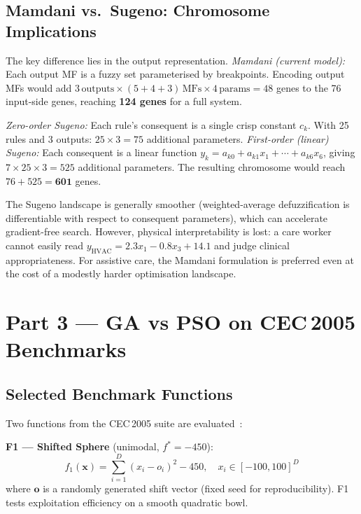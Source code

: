 \documentclass[10pt,twocolumn,a4paper]{article}
\begin{document}
\subsection{Mamdani vs.\ Sugeno: Chromosome Implications}

The key difference lies in the output representation. \textit{Mamdani (current model):} Each output MF is a fuzzy set parameterised by breakpoints. Encoding output MFs would add $3\,\text{outputs}\times(5+4+3)\,\text{MFs}\times4\,\text{params}=48$ genes to the 76 input-side genes, reaching \textbf{124 genes} for a full system.

\textit{Zero-order Sugeno:} Each rule's consequent is a single crisp constant $c_k$. With 25 rules and 3 outputs: $25\times3=75$ additional parameters. \textit{First-order (linear) Sugeno:} Each consequent is a linear function $y_k = a_{k0}+a_{k1}x_1+\cdots+a_{k6}x_6$, giving $7\times25\times3=525$ additional parameters. The resulting chromosome would reach $76+525=\mathbf{601}$ genes.

The Sugeno landscape is generally smoother (weighted-average defuzzification is differentiable with respect to consequent parameters), which can accelerate gradient-free search. However, physical interpretability is lost: a care worker cannot easily read $y_{\text{HVAC}}=2.3x_1-0.8x_3+14.1$ and judge clinical appropriateness. For assistive care, the Mamdani formulation is preferred even at the cost of a modestly harder optimisation landscape.

\section{Part 3 --- GA vs PSO on CEC\,2005 Benchmarks}
\label{sec:part3}

\subsection{Selected Benchmark Functions}

Two functions from the CEC\,2005 suite are evaluated~\cite{suganthan2005}:

\textbf{F1 --- Shifted Sphere} (unimodal, $f^*=-450$):
\begin{equation}
  f_1(\bm{x}) = \sum_{i=1}^{D}(x_i - o_i)^2 - 450, \quad x_i\in[-100,100]^D
\end{equation}
where $\bm{o}$ is a randomly generated shift vector (fixed seed for reproducibility). F1 tests exploitation efficiency on a smooth quadratic bowl.
\end{document}
